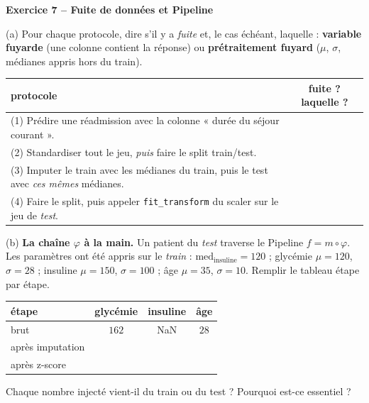 \documentclass[10pt,a4paper]{article}
\newcommand{\repligne}{\par\vspace{0.42cm}\noindent\dotfill}
\begin{document}
\vspace{0.5cm}

\textbf{\large Exercice 7 -- Fuite de données et Pipeline}

\vspace{0.15cm}

(a) Pour chaque protocole, dire s'il y a \emph{fuite} et, le cas échéant, laquelle : \textbf{variable fuyarde} (une colonne contient la réponse) ou \textbf{prétraitement fuyard} ($\mu$, $\sigma$, médianes appris hors du train).

\vspace{0.15cm}
{\small
\renewcommand{\arraystretch}{1.8}
\begin{tabular}{|p{11.3cm}|c|}
\hline
protocole & fuite ? laquelle ?\\
\hline
(1) Prédire une réadmission avec la colonne « durée du séjour courant ». & \\
\hline
(2) Standardiser tout le jeu, \emph{puis} faire le split train/test. & \\
\hline
(3) Imputer le train avec les médianes du train, puis le test avec \emph{ces mêmes} médianes. & \\
\hline
(4) Faire le split, puis appeler \texttt{fit\_transform} du scaler sur le jeu de \emph{test}. & \\
\hline
\end{tabular}
}

\vspace{0.25cm}
(b) \textbf{La chaîne $\varphi$ à la main.} Un patient du \emph{test} traverse le Pipeline $f = m \circ \varphi$. Les paramètres ont été appris sur le \emph{train} : $\text{med}_{\text{insuline}} = 120$ ; glycémie $\mu = 120$, $\sigma = 28$ ; insuline $\mu = 150$, $\sigma = 100$ ; âge $\mu = 35$, $\sigma = 10$. Remplir le tableau étape par étape.

\vspace{0.15cm}
{\small
\renewcommand{\arraystretch}{2.1}
\begin{tabular}{|l|c|c|c|}
\hline
étape & glycémie & insuline & âge\\
\hline
brut & $162$ & NaN & $28$\\
\hline
après imputation & & & \\
\hline
après z-score & & & \\
\hline
\end{tabular}
}

\vspace{0.15cm}
Chaque nombre injecté vient-il du train ou du test ? Pourquoi est-ce essentiel ?
\repligne
\repligne
\end{document}
